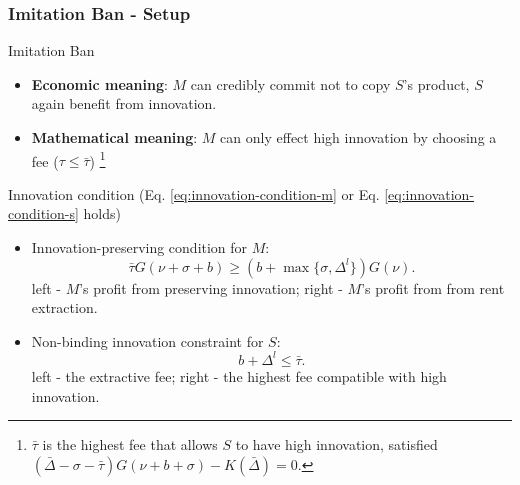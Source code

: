 \begin{frame}
  \frametitle{Imitation Ban - Setup}
  \small

  \begin{block}{Imitation Ban}
    \begin{itemize}
      \item \textbf{Economic meaning}: $M$ can credibly commit not to copy $S$'s product, $S$ again benefit from innovation.
      \item \textbf{Mathematical meaning}: $M$ can only effect high innovation by choosing a fee ($ \tau\leq\bar{\tau} $) \footnote{$\bar{\tau}$ is the highest fee that allows $S$ to have high innovation, satisfied $(\bar{\Delta}-\sigma-\bar{\tau})G(\nu+b+\sigma)-K(\bar{\Delta})=0$.}
    \end{itemize}
  \end{block}

  \begin{block}{Innovation condition (Eq. \eqref{eq:innovation-condition-m} or Eq. \eqref{eq:innovation-condition-s} holds)}
    \begin{itemize}
  \item Innovation-preserving condition for $M$: 
  \begin{equation}\label{eq:innovation-condition-m}
    \bar{\tau} G(\nu+\sigma+b) 
    \geq 
    (b+\max\{\sigma,\Delta^l\})G(\nu).
  \end{equation}
  left - $M$'s profit from preserving innovation; 
  right - $M$'s profit from from rent extraction.

  \item Non-binding innovation constraint for $S$: 
  \begin{equation}\label{eq:innovation-condition-s}
    b+\Delta^l\leq\bar{\tau}.
  \end{equation}
  left - the extractive fee; right - the  highest fee compatible with high innovation.
\end{itemize}
  \end{block}

\end{frame}

